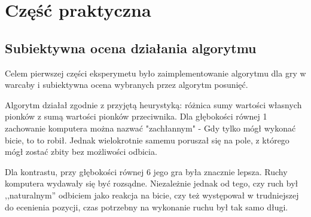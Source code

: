 \section{Część praktyczna}
\subsection{Subiektywna ocena działania algorytmu}
Celem pierwszej części eksperymetu było zaimplementowanie algorytmu dla gry
w warcaby i subiektywna ocena wybranych przez algorytm posunięć.

Algorytm działał zgodnie z przyjętą heurystyką: różnica sumy wartości własnych
pionków z sumą wartości pionków przeciwnika. Dla głębokości równej 1 zachowanie
komputera można nazwać "zachłannym" - Gdy tylko mógł wykonać bicie, to to
robił. Jednak wielokrotnie samemu poruszał się na pole, z którego mógł zostać
zbity bez możliwości odbicia.

Dla kontrastu, przy głębokości równej 6 jego gra była znacznie lepsza. Ruchy
komputera wydawały się być rozsądne. Niezależnie jednak od tego, czy ruch był
,,naturalnym'' odbiciem jako reakcja na bicie, czy też występował w trudniejszej
do ecenienia pozycji, czas potrzebny na wykonanie ruchu był tak samo długi.


